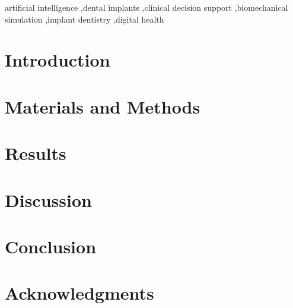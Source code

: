\documentclass[5p,twocolumn,times]{elsarticle}
\begin{document}
\begin{frontmatter}
\begin{keyword}
artificial intelligence \sep dental implants \sep clinical decision support \sep biomechanical simulation \sep implant dentistry \sep digital health
\end{keyword}

\end{frontmatter}

\section{Introduction}


\section{Materials and Methods}


\section{Results}


\section{Discussion}


\section{Conclusion}


\section*{Acknowledgments}

\end{document}
